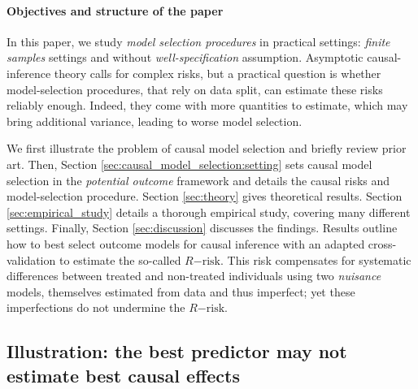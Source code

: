 \documentclass{report}
\begin{document}
\paragraph{Objectives and structure of the paper}

In this paper, we study \textit{model selection procedures}
in practical settings: \textit{finite samples} settings and without
\textit{well-specification} assumption. Asymptotic causal-inference
theory calls for complex risks, but a practical question is
whether model-selection procedures, that rely on data split, can estimate
these risks reliably enough. Indeed, they
come with more quantities to estimate, which may
bring additional variance, leading to worse model selection.

We first illustrate the problem of causal model
selection and briefly review prior art. Then, Section
\ref{sec:causal_model_selection:setting} sets causal model selection in the
\emph{potential outcome} framework and details the causal risks and
model-selection procedure. Section \ref{sec:theory} gives theoretical
results. Section \ref{sec:empirical_study} details a thorough empirical
study, covering many different settings. Finally, Section \ref{sec:discussion}
discusses the findings.
%
Results outline how to best select outcome models for causal
inference with an adapted
cross-validation to estimate the so-called $R\mathrm{-risk}$.
This risk compensates for systematic
differences between treated and non-treated individuals using
two \emph{nuisance} models,
themselves estimated from data and thus imperfect; yet these
imperfections do not undermine the $R\mathrm{-risk}$.


\subsection{Illustration: the best predictor may not estimate best causal
  effects}%
\label{subsec:causal_model_selection:illustration}%
\end{document}
